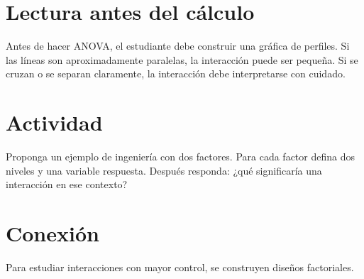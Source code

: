 \section{Lectura antes del cálculo}

Antes de hacer ANOVA, el estudiante debe construir una gráfica de perfiles. Si las líneas son aproximadamente paralelas, la interacción puede ser pequeña. Si se cruzan o se separan claramente, la interacción debe interpretarse con cuidado.

\section{Actividad}

Proponga un ejemplo de ingeniería con dos factores. Para cada factor defina dos niveles y una variable respuesta. Después responda: ¿qué significaría una interacción en ese contexto?

\section{Conexión}

Para estudiar interacciones con mayor control, se construyen diseños factoriales.
